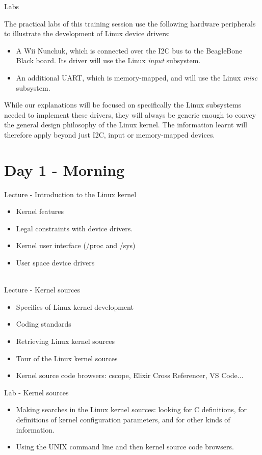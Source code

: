 \documentclass[a4paper,12pt,obeyspaces,spaces,hyphens]{article}
\begin{document}
\feagendaonecolumn
{Labs}
{
  The practical labs of this training session use the following
  hardware peripherals to illustrate the development of Linux device
  drivers:

  \begin{itemize}
  \item A Wii Nunchuk, which is connected over the I2C bus to the
    BeagleBone Black board. Its driver will use the Linux {\em input}
    subsystem.
  \item An additional UART, which is memory-mapped, and will use the
    Linux {\em misc} subsystem.
  \end{itemize}

  While our explanations will be focused on specifically the Linux
  subsystems needed to implement these drivers, they will always be
  generic enough to convey the general design philosophy of the Linux
  kernel. The information learnt will therefore apply beyond just
  I2C, input or memory-mapped devices.
}


\section{Day 1 - Morning}

\feagendaonecolumn
{Lecture - Introduction to the Linux kernel}
{
  \begin{itemize}
  \item Kernel features
  \item Legal constraints with device drivers.
  \item Kernel user interface (/proc and /sys)
  \item User space device drivers
  \end{itemize}
}
\\
\feagendatwocolumn
{Lecture - Kernel sources}
{
  \begin{itemize}
  \item Specifics of Linux kernel development
  \item Coding standards
  \item Retrieving Linux kernel sources
  \item Tour of the Linux kernel sources
  \item Kernel source code browsers: cscope,
	Elixir Cross Referencer, VS Code...
  \end{itemize}
}
{Lab - Kernel sources}
{
  \begin{itemize}
  \item Making searches in the Linux kernel sources: looking for C
    definitions, for definitions of kernel configuration parameters,
    and for other kinds of information.
  \item Using the UNIX command line and then kernel source code
    browsers.
 \end{itemize}
}
\end{document}
